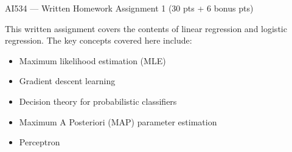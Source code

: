 \documentclass{article}
\begin{document}
{\Large
\begin{center}
AI534 --- Written Homework Assignment 1 (30 pts + 6 bonus pts) 
\end{center}
}

\noindent This written assignment covers the contents of linear regression and logistic regression. The key concepts covered here include:
\begin{itemize}
    \item Maximum likelihood estimation  (MLE)
    \item Gradient descent learning
    \item Decision theory for probabilistic classifiers
    \item Maximum A Posteriori (MAP) parameter estimation 
    \item Perceptron
\end{itemize}
\end{document}
